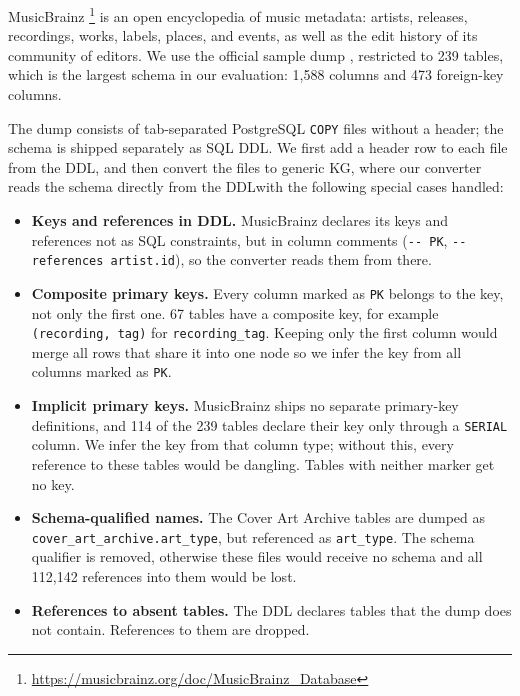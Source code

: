 MusicBrainz \footnote{\url{https://musicbrainz.org/doc/MusicBrainz_Database}} is an open encyclopedia of music metadata: artists, releases, recordings, works, labels, places, and events, as well as the edit history of its community of editors. We use the official sample dump \citep{musicbrainz_dump}, restricted to 239 tables, which is the largest schema in our evaluation: 1{,}588 columns and 473 foreign-key columns.

The dump consists of tab-separated PostgreSQL \texttt{COPY} files without a header; the schema is shipped separately as SQL DDL\@. We first add a header row to each file from the DDL, and then convert the files to generic KG, where our converter reads the schema directly from the DDL\@ with the following special cases handled: 
\begin{itemize}[leftmargin=*, itemsep=2pt]
  \item \textbf{Keys and references in DDL.} MusicBrainz declares its keys and references not as SQL constraints, but in column comments (\texttt{-{}- PK}, \texttt{-{}- references artist.id}), so the converter reads them from there.
  \item \textbf{Composite primary keys.} Every column marked as \texttt{PK} belongs to the key, not only the first one. 67 tables have a composite key, for example \texttt{(recording, tag)} for \texttt{recording\_tag}. Keeping only the first column would merge all rows that share it into one node so we infer the key from all columns marked as \texttt{PK}.
  \item \textbf{Implicit primary keys.} MusicBrainz ships no separate primary-key definitions, and 114 of the 239 tables declare their key only through a \texttt{SERIAL} column. We infer the key from that column type; without this, every reference to these tables would be dangling. Tables with neither marker get no key.
  \item \textbf{Schema-qualified names.} The Cover Art Archive tables are dumped as \texttt{cover\_art\_archive.art\_type}, but referenced as \texttt{art\_type}. The schema qualifier is removed, otherwise these files would receive no schema and all 112{,}142 references into them would be lost.
  \item \textbf{References to absent tables.} The DDL declares tables that the dump does not contain. References to them are dropped.
\end{itemize}

